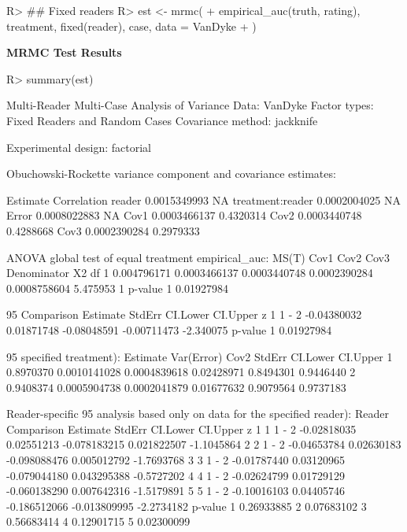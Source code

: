 \documentclass[
]{jss}
\begin{document}
\begin{CodeChunk}
\begin{CodeInput}
R> ## Fixed readers
R> est <- mrmc(
+   empirical_auc(truth, rating), treatment, fixed(reader), case, data = VanDyke
+ )
\end{CodeInput}
\end{CodeChunk}

\textbf{MRMC Test Results}

\begin{CodeChunk}
\begin{CodeInput}
R> summary(est)
\end{CodeInput}
\begin{CodeOutput}
Multi-Reader Multi-Case Analysis of Variance
Data: VanDyke
Factor types: Fixed Readers and Random Cases
Covariance method: jackknife

Experimental design: factorial 

Obuchowski-Rockette variance component and covariance estimates:

                     Estimate Correlation
reader           0.0015349993          NA
treatment:reader 0.0002004025          NA
Error            0.0008022883          NA
Cov1             0.0003466137   0.4320314
Cov2             0.0003440748   0.4288668
Cov3             0.0002390284   0.2979333


ANOVA global test of equal treatment empirical_auc:
        MS(T)         Cov1         Cov2         Cov3  Denominator       X2 df
1 0.004796171 0.0003466137 0.0003440748 0.0002390284 0.0008758604 5.475953  1
     p-value
1 0.01927984


95%
  Comparison    Estimate     StdErr    CI.Lower    CI.Upper         z
1      1 - 2 -0.04380032 0.01871748 -0.08048591 -0.00711473 -2.340075
     p-value
1 0.01927984


95%
specified treatment):
   Estimate   Var(Error)         Cov2     StdErr  CI.Lower  CI.Upper
1 0.8970370 0.0010141028 0.0004839618 0.02428971 0.8494301 0.9446440
2 0.9408374 0.0005904738 0.0002041879 0.01677632 0.9079564 0.9737183


Reader-specific 95%
analysis based only on data for the specified reader):
  Reader Comparison    Estimate     StdErr     CI.Lower     CI.Upper          z
1      1      1 - 2 -0.02818035 0.02551213 -0.078183215  0.021822507 -1.1045864
2      2      1 - 2 -0.04653784 0.02630183 -0.098088476  0.005012792 -1.7693768
3      3      1 - 2 -0.01787440 0.03120965 -0.079044180  0.043295388 -0.5727202
4      4      1 - 2 -0.02624799 0.01729129 -0.060138290  0.007642316 -1.5179891
5      5      1 - 2 -0.10016103 0.04405746 -0.186512066 -0.013809995 -2.2734182
     p-value
1 0.26933885
2 0.07683102
3 0.56683414
4 0.12901715
5 0.02300099



\end{CodeOutput}
\end{CodeChunk}
\end{document}
